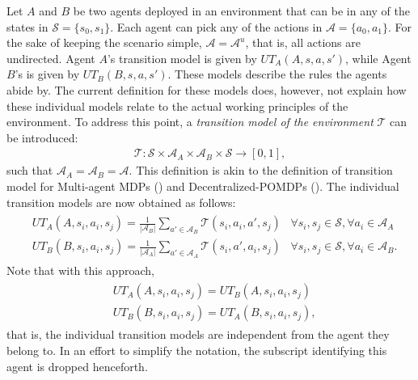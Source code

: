 Let $A$ and $B$ be two agents deployed in an environment that can be in any of the states in $\mathcal{S} = \{s_0, s_1 \}$. Each agent can pick any of the actions in $\mathcal{A} = \{ a_0, a_1\}$. For the sake of keeping the scenario simple, $\mathcal{A} = \mathcal{A}^u$, that is, all actions are undirected. Agent $A$'s transition model is given by $UT_A(A, s, a, s')$, while Agent $B$'s is given by $UT_B(B, s, a, s')$. These models describe the rules the agents abide by. The current definition for these models does, however, not explain how these individual models relate to the actual working principles of the environment. To address this point, a \textit{transition model of the environment} $\mathcal{T}$ can be introduced: 
\begin{align}
    \mathcal{T} : \mathcal{S} \times \mathcal{A}_A \times \mathcal{A}_B \times  \mathcal{S} \rightarrow [0,1],
\end{align}
such that $\mathcal{A}_A = \mathcal{A}_B = \mathcal{A}$. This definition is akin to the definition of transition model for Multi-agent MDPs () and Decentralized-POMDPs (). The individual transition models are now obtained as follows:
\begin{align}
\begin{split}
    &UT_A(A, s_i, a_i, s_j) = \frac{1}{|\mathcal{A}_B|} \sum_{a' \in \mathcal{A}_B} \mathcal{T}(s_i, a_i, a', s_j)  \,\,\,\,\, \forall s_i, s_j \in \mathcal{S}, \forall a_i \in \mathcal{A}_A \\&
    UT_B(B, s_i, a_i, s_j) = \frac{1}{|\mathcal{A}_A|} \sum_{a' \in \mathcal{A}_A} \mathcal{T}(s_i, a', a_i, s_j)  
    \,\,\,\,\, \forall s_i, s_j \in \mathcal{S}, \forall a_i \in \mathcal{A}_B.
\end{split}
\end{align}
Note that with this approach, 
\begin{align}
\begin{split}
    &UT_A(A, s_i, a_i, s_j) = UT_B(A, s_i, a_i, s_j) \\& UT_B(B, s_i, a_i, s_j) = UT_A(B, s_i, a_i, s_j),
\end{split}
\end{align}
that is, the individual transition models are independent from the agent they belong to. In an effort to simplify the notation, the subscript identifying this agent is dropped henceforth.

